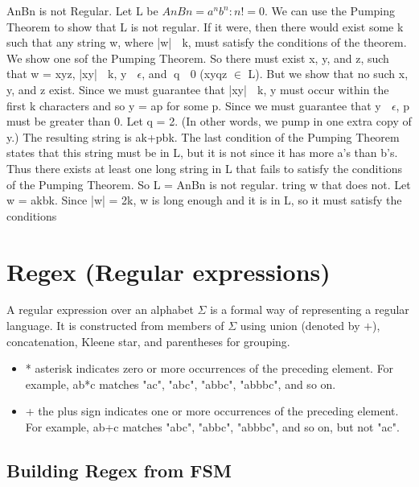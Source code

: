 \documentclass{article}
\begin{document}
AnBn is not Regular. Let L be $AnBn = {a^nb^n : n != 0}$.  We can use the
Pumping Theorem to show that L is not regular.  If it were, then there would
exist some k such that any string w, where |w|  k, must satisfy the conditions
of the theorem.  We show one sof the Pumping Theorem.  So there must exist x,
y, and z, such that w = xyz, |xy|  k, y  $\epsilon$, and q  0 (xyqz $\in$ L).  But we
show that no such x, y, and z exist.  Since we must guarantee that |xy|  k, y
must occur within the first k characters and so y = ap for some p.  Since we
must guarantee that y  $\epsilon$, p must be greater than 0.  Let q = 2. (In other
words, we pump in one extra copy of y.)  The resulting string is ak+pbk.  The
last condition of the Pumping Theorem states that this string must be in L, but
it is not since it has more a’s than b’s.  Thus there exists at least one long
string in L that fails to satisfy the conditions of the Pumping Theorem.  So L
= AnBn is not regular. tring w that does not.  Let w = akbk.  Since |w| = 2k, w
is long enough and it is in L, so it must satisfy the conditions 


\section{Regex (Regular expressions)}

A regular expression over an alphabet $\Sigma$ is a formal way of representing
a regular language. It is constructed from members of $\Sigma$ using union
(denoted by $+$), concatenation, Kleene star, and parentheses for grouping.

\begin{itemize}
	 
		\item * asterisk indicates zero or more occurrences of the preceding element.
		For example, ab*c matches "ac", "abc", "abbc", "abbbc", and so on. 

		\item + the plus sign indicates one or more occurrences of the preceding element.
		For example, ab+c matches "abc", "abbc", "abbbc", and so on, but not "ac". 
\end{itemize}

\subsection{Building Regex from FSM}
\end{document}
